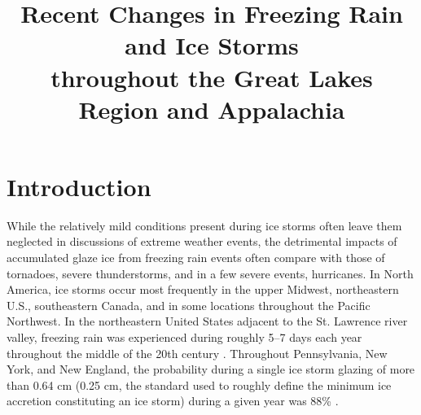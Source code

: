\documentclass[twocol]{ametsoc}
\title{Recent Changes in Freezing Rain and Ice Storms\\ throughout the Great Lakes Region and Appalachia}
\affiliation{Department of Climate and Space Sciences and Engineering, University of Michigan, Ann Arbor, Michigan}
\begin{document}
\maketitle


%
\section{Introduction}
While the relatively mild conditions present during ice storms often leave them neglected in discussions of extreme weather events, the detrimental impacts of accumulated glaze ice from freezing rain events often compare with those of tornadoes, severe thunderstorms, and in a few severe events, hurricanes.  In North America, ice storms occur most frequently in the upper Midwest, northeastern U.S., southeastern Canada, and in some locations throughout the Pacific Northwest. In the northeastern United States adjacent to the St. Lawrence river valley, freezing rain was experienced during roughly 5--7 days each year throughout the middle of the 20th century \citep{changnon2003temporal}. Throughout Pennsylvania, New York, and New England, the probability during a single ice storm glazing of more than 0.64 cm (0.25 cm, the standard used to roughly define the minimum ice accretion constituting an ice storm) during a given year was 88\% \citep{nwsglossary,tattelman1973estimated}. 
\end{document}
